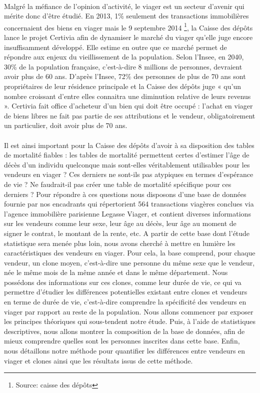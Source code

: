 \documentclass[12pt,a4paper]{article}
\begin{document}
\paragraph{}
Malgré la méfiance de l’opinion d’activité, le viager est un secteur d’avenir qui mérite donc d’être étudié. En 2013, 1\% seulement des transactions immobilières concernaient des biens en viager mais le 9 septembre 2014 \footnote{Source: caisse des dépôts}, la Caisse des dépôts lance le projet Certivia afin de dynamiser le marché du viager qu’elle juge encore insuffisamment développé. Elle estime en outre que ce marché permet de répondre aux enjeux du vieillissement de la population. Selon l’Insee, en 2040, 30\% de la population française, c’est-à-dire 8 millions de personnes, devraient avoir plus de 60 ans. D’après l’Insee, 72\% des personnes de plus de 70 ans sont propriétaires de leur résidence principale et la Caisse des dépôts juge  « qu’un nombre croissant d’entre elles connaitra une diminution relative de leurs revenus ». Certivia fait office d’acheteur d’un bien qui doit être occupé : l’achat en viager de biens  libres ne fait pas partie de ses attributions et  le vendeur, obligatoirement un particulier, doit avoir plus de 70 ans. 
\paragraph{}
Il est ainsi important pour la Caisse des dépôts d’avoir à sa disposition des tables de mortalité fiables : les tables de mortalité permettent certes d’estimer l’âge de décès d’un individu quelconque mais sont-elles véritablement utilisables pour les vendeurs en viager ? Ces derniers ne sont-ils pas atypiques en termes d’espérance de vie ? Ne faudrait-il pas créer une table de mortalité spécifique pour ces derniers ?  Pour répondre à ces questions nous disposons d’une base de données fournie par nos encadrants qui répertorient 564 transactions viagères conclues via l’agence immobilière parisienne Legasse Viager, et contient diverses informations sur les vendeurs comme leur sexe, leur âge au décès, leur âge au moment de signer le contrat, le montant de la rente, etc. A partir de cette base dont l’étude statistique sera menée plus loin, nous avons cherché à mettre en lumière les caractéristiques des vendeurs en viager. Pour cela, la base comprend, pour chaque vendeur, un clone moyen, c’est-à-dire une personne du même sexe que le vendeur, née le même mois de la même année et dans le même département. Nous possédons des informations sur ces clones, comme leur durée de vie, ce qui va permettre d’étudier les différences potentielles existant entre clones et vendeurs en terme de durée de vie, c’est-à-dire comprendre la spécificité des vendeurs en viager par rapport au reste de la population. 
Nous allons commencer par exposer les principes théoriques qui sous-tendent notre étude. Puis, à l’aide de statistiques descriptives, nous allons montrer la composition de la base de données, afin de mieux comprendre quelles sont les personnes inscrites dans cette base. Enfin, nous détaillons notre méthode pour quantifier les différences entre vendeurs en viager et clones ainsi que les résultats issus de cette méthode.
\end{document}
